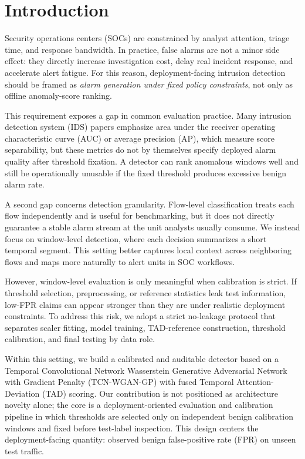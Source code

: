 \section{Introduction}

Security operations centers (SOCs) are constrained by analyst attention, triage time, and response bandwidth. In practice, false alarms are not a minor side effect: they directly increase investigation cost, delay real incident response, and accelerate alert fatigue. For this reason, deployment-facing intrusion detection should be framed as \emph{alarm generation under fixed policy constraints}, not only as offline anomaly-score ranking.

This requirement exposes a gap in common evaluation practice. Many intrusion detection system (IDS) papers emphasize area under the receiver operating characteristic curve (AUC) or average precision (AP), which measure score separability, but these metrics do not by themselves specify deployed alarm quality after threshold fixation. A detector can rank anomalous windows well and still be operationally unusable if the fixed threshold produces excessive benign alarm rate.

A second gap concerns detection granularity. Flow-level classification treats each flow independently and is useful for benchmarking, but it does not directly guarantee a stable alarm stream at the unit analysts usually consume. We instead focus on window-level detection, where each decision summarizes a short temporal segment. This setting better captures local context across neighboring flows and maps more naturally to alert units in SOC workflows.

However, window-level evaluation is only meaningful when calibration is strict. If threshold selection, preprocessing, or reference statistics leak test information, low-FPR claims can appear stronger than they are under realistic deployment constraints. To address this risk, we adopt a strict no-leakage protocol that separates scaler fitting, model training, TAD-reference construction, threshold calibration, and final testing by data role.

Within this setting, we build a calibrated and auditable detector based on a Temporal Convolutional Network Wasserstein Generative Adversarial Network with Gradient Penalty (TCN-WGAN-GP) with fused Temporal Attention-Deviation (TAD) scoring. Our contribution is not positioned as architecture novelty alone; the core is a deployment-oriented evaluation and calibration pipeline in which thresholds are selected only on independent benign calibration windows and fixed before test-label inspection. This design centers the deployment-facing quantity: observed benign false-positive rate (FPR) on unseen test traffic.

